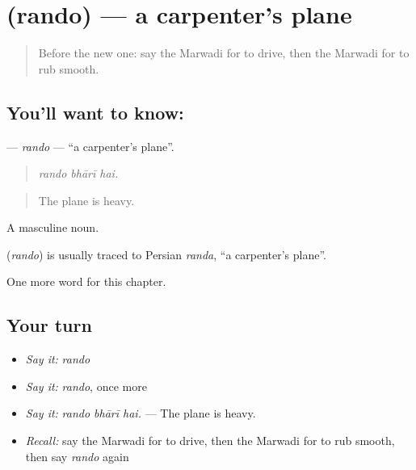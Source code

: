 \section[\texorpdfstring{\mw{रंदो} (rando)}{रंदो (rando)}]{ (rando) — a carpenter's plane}

\label{lesson:MW-C289-rando}



\begin{quote}
Before the new one: say the Marwadi for to drive, then the Marwadi for to rub smooth.
\end{quote}

\subsection*{You'll want to know: }
\textbf{} — \emph{rando} — \textquotedblleft{}a carpenter's plane\textquotedblright{}.

\begin{quote}
  
\end{quote}

\begin{quote}
\emph{rando bhārī hai.}
\end{quote}

\begin{quote}
The plane is heavy.
\end{quote}

A masculine noun.

\begin{cousinweb}
\textbf{} (\emph{rando}) is usually traced to Persian \emph{randa}, \textquotedblleft{}a carpenter's plane\textquotedblright{}.
\end{cousinweb}

\begin{grammarlens}[title={What you've built}]
One more word for this chapter.
\end{grammarlens}

\subsection*{Your turn}
\begin{itemize}
\raggedright
  \item \emph{Say it:} \emph{rando}
  \item \emph{Say it:} \emph{rando}, once more
  \item \emph{Say it:} \emph{rando bhārī hai.} — The plane is heavy.
  \item \emph{Recall:} say the Marwadi for to drive, then the Marwadi for to rub smooth, then say \emph{rando} again
\end{itemize}

